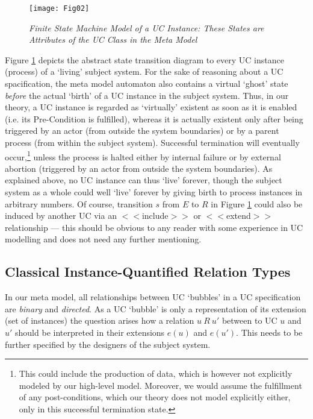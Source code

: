 \begin{figure}[t!]
\begin{center}
\texttt{[image: Fig02]}\\   
\caption{\it Finite State Machine Model of a UC Instance: These States
             are Attributes of the UC Class in the Meta Model}
\label{fig:2} 
\end{center} 
\end{figure}
Figure \ref{fig:2} depicts the abstract state transition diagram to every 
UC instance (process) of a `living' subject system. For the sake of reasoning 
about a UC spacification, the meta model automaton also contains a virtual 
`ghost' state \emph{before} the actual `birth' of a UC instance in the subject 
system. Thus, in our theory, a UC instance is regarded as `virtually' existent 
as soon as it is enabled (i.e. its Pre-Condition is fulfilled), whereas it 
is actually existent only after being triggered by an actor (from outside 
the system boundaries) or by a parent process (from within the subject system). 
Successful termination will eventually occur,\footnote{This could include the 
	production of data, which is however not explicitly modeled by our high-level 
	model. Moreover, we would assume the fulfillment of any post-conditions, which 
	our theory does not model explicitly either, only in this successful termination 
	state.} 
unless the process is halted either by internal failure or by external abortion 
(triggered by an actor from outside the system boundaries). As explained above, 
no UC instance can thus `live' forever, though the subject system as a whole 
could well `live' forever by giving birth to process instances in arbitrary 
numbers. Of course, transition $s$ from $E$ to $R$ in Figure \ref{fig:2} 
could also be induced by another UC via an $<<$include$>>$ or $<<$extend$>>$ 
relationship --- this should be obvious to any reader with some experience 
in UC modelling and does not need any further mentioning.

\subsection{Classical Instance-Quantified Relation Types}

In our meta model, all relationships between UC `bubbles' 
in a UC specification are \emph{binary} and \emph{directed}. 
As a UC `bubble' is only a representation of its extension
(set of instances) the question arises how a relation 
$u~R~u'$ between to UC $u$ and $u'$ should be interpreted
in their extensions $e(u)$ and $e(u')$. This needs to be
further specified by the designers of the subject system.

